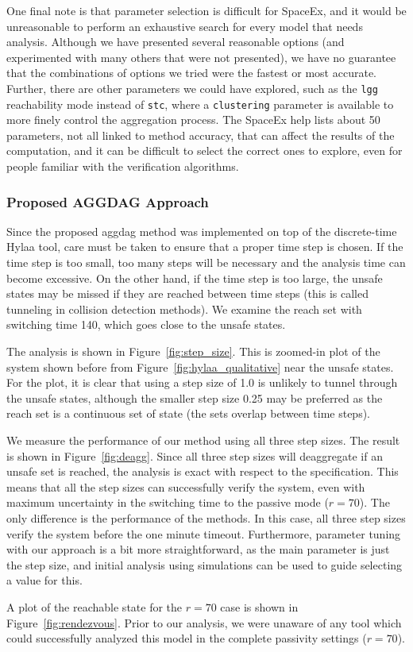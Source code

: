 
One final note is that parameter selection is difficult for SpaceEx, and it would be unreasonable to perform an exhaustive search for every model
that needs analysis.
%
Although we have presented several reasonable options (and experimented with many others that were not presented), we have no guarantee that
the combinations of options we tried were the fastest or most accurate.
%
Further, there are other parameters we could have explored, such as the \texttt{lgg} reachability mode instead of \texttt{stc}, where a \texttt{clustering}
parameter is available to more finely control the aggregation process.
%
The SpaceEx help lists about 50 parameters, not all linked to method accuracy, that can affect the results of the computation,
and it can be difficult to select the correct ones to explore, even for people familiar with the verification algorithms.

\subsubsection{Proposed AGGDAG Approach}

Since the proposed aggdag method was implemented on top of the discrete-time Hylaa tool, care must be taken to ensure that a proper time step is chosen.
%
If the time step is too small, too many steps will be necessary and the analysis time can become excessive.
%
On the other hand, if the time step is too large, the unsafe states may be missed if they are reached between time steps
(this is called tunneling in collision detection methods).
%
We examine the reach set with switching time 140, which goes close to the unsafe states.

The analysis is shown in Figure~\ref{fig:step_size}.
%
This is zoomed-in plot of the system shown before from Figure~\ref{fig:hylaa_qualitative} near the unsafe states.
%
For the plot, it is clear that using a step size of 1.0 is unlikely to tunnel through the unsafe states,
although the smaller step size 0.25 may be preferred as the
reach set is a continuous set of state (the sets overlap between time steps).


We measure the performance of our method using all three step sizes.
%
The result is shown in Figure~\ref{fig:deagg}.
%
Since all three step sizes will deaggregate if an unsafe set is reached, the analysis is exact with respect to the specification.
%
This means that all the step sizes can successfully verify the system, even with maximum uncertainty in the switching time to the passive mode ($r = 70$).
%
The only difference is the performance of the methods.
%
In this case, all three step sizes verify the system before the one minute timeout.
%
Furthermore, parameter tuning with our approach is a bit more straightforward, as the main parameter is just the step size, and initial
analysis using simulations can be used to guide selecting a value for this.


A plot of the reachable state for the $r=70$ case is shown in Figure~\ref{fig:rendezvous}.
%
Prior to our analysis, we were unaware of any tool which could successfully analyzed this model in the complete passivity settings ($r=70$).


